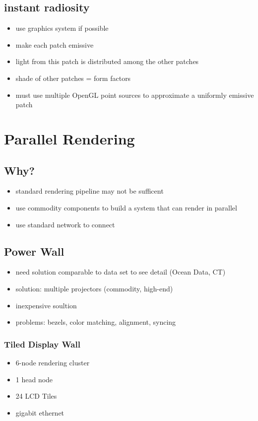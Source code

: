 \documentclass[11pt,a4paper]{article}
\begin{document}
\subsection{instant radiosity}
\begin{itemize}
	\item use graphics system if possible
	\item make each patch emissive
	\item light from this patch is distributed among the other patches
	\item shade of other patches = form factors
	\item must use multiple OpenGL point sources to approximate a uniformly emissive patch
\end{itemize}

\section{Parallel Rendering}
\subsection{Why?}
\begin{itemize}
	\item standard rendering pipeline may not be sufficent
	\item use commodity components to build a system that can render in parallel
	\item use standard network to connect
\end{itemize}
\subsection{Power Wall}
\begin{itemize}
	\item need solution comparable to data set to see detail (Ocean Data, CT)
	\item solution: multiple projectors (commodity, high-end)
	\item inexpensive soultion
	\item problems: bezels, color matching, alignment, syncing
\end{itemize}
\subsubsection{Tiled Display Wall}
\begin{itemize}
	\item 6-node rendering cluster
	\item 1 head node
	\item 24 LCD Tiles
	\item gigabit ethernet
\end{itemize}
\end{document}
